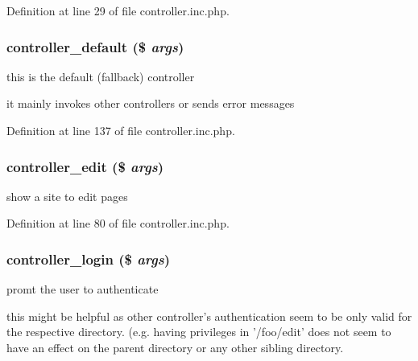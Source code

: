 Definition at line 29 of file controller.inc.php.

\hypertarget{controller_8inc_8php_ae9c67435a37f4b70d0769079c9dbf379}{
\subsubsection[{controller\_\-default}]{\setlength{\rightskip}{0pt plus 5cm}controller\_\-default (\$ {\em args})}}
\label{controller_8inc_8php_ae9c67435a37f4b70d0769079c9dbf379}
this is the default (fallback) controller

it mainly invokes other controllers or sends error messages 

Definition at line 137 of file controller.inc.php.

\hypertarget{controller_8inc_8php_a406fb5b2a2a93bef89e4ba46f8829d2f}{
\subsubsection[{controller\_\-edit}]{\setlength{\rightskip}{0pt plus 5cm}controller\_\-edit (\$ {\em args})}}
\label{controller_8inc_8php_a406fb5b2a2a93bef89e4ba46f8829d2f}
show a site to edit pages 

Definition at line 80 of file controller.inc.php.

\hypertarget{controller_8inc_8php_ac3e283e26869e2ffd938bdf9775c3e81}{
\subsubsection[{controller\_\-login}]{\setlength{\rightskip}{0pt plus 5cm}controller\_\-login (\$ {\em args})}}
\label{controller_8inc_8php_ac3e283e26869e2ffd938bdf9775c3e81}
promt the user to authenticate

this might be helpful as other controller's authentication seem to be only valid for the respective directory. (e.g. having privileges in '/foo/edit' does not seem to have an effect on the parent directory or any other sibling directory. 


